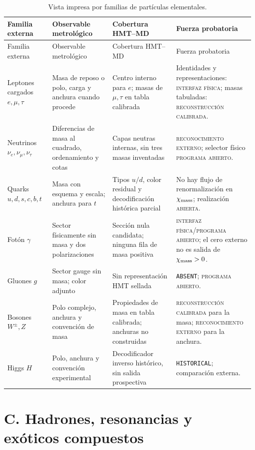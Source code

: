 \begin{longtable}{@{}L{0.19\textwidth}L{0.23\textwidth}L{0.20\textwidth}L{0.28\textwidth}@{}}
\caption{Vista impresa por familias de partículas elementales.}
\label{tab:catalogo-elementales}\\
\toprule
Familia externa & Observable metrológico & Cobertura HMT--MD &
Fuerza probatoria\\
\midrule
\endfirsthead
\toprule
Familia externa & Observable metrológico & Cobertura HMT--MD &
Fuerza probatoria\\
\midrule
\endhead
Leptones cargados \(e,\mu,\tau\)&
Masa de reposo o polo, carga y anchura cuando procede&
Centro interno para \(e\); masas de \(\mu,\tau\) en tabla calibrada&
Identidades y representaciones: \textsc{interfaz física}; masas tabuladas:
\textsc{reconstrucción calibrada}.\\
Neutrinos \(\nu_e,\nu_\mu,\nu_\tau\)&
Diferencias de masa al cuadrado, ordenamiento y cotas&
Capas neutras internas, sin tres masas inventadas&
\textsc{reconocimiento externo}; selector físico
\textsc{programa abierto}.\\
Quarks \(u,d,s,c,b,t\)&
Masa con esquema y escala; anchura para \(t\)&
Tipos \(u/d\), color residual y decodificación histórica parcial&
No hay flujo de renormalización en \(\chi_{\rm mass}\);
realización \textsc{abierta}.\\
Fotón \(\gamma\)&
Sector físicamente sin masa y dos polarizaciones&
Sección nula candidata; ninguna fila de masa positiva&
\textsc{interfaz física}/\textsc{programa abierto}; el cero externo no es
salida de \(\chi_{\rm mass}>0\).\\
Gluones \(g\)&
Sector gauge sin masa; color adjunto&
Sin representación HMT sellada&
\texttt{ABSENT}; \textsc{programa abierto}.\\
Bosones \(W^\pm,Z\)&
Polo complejo, anchura y convención de masa&
Propiedades de masa en tabla calibrada; anchuras no construidas&
\textsc{reconstrucción calibrada} para la masa;
\textsc{reconocimiento externo} para la anchura.\\
Higgs \(H\)&
Polo, anchura y convención experimental&
Decodificador inverso histórico, sin salida prospectiva&
\texttt{HISTORICAL}; comparación externa.\\
\bottomrule
\end{longtable}

\section{C. Hadrones, resonancias y exóticos compuestos}

